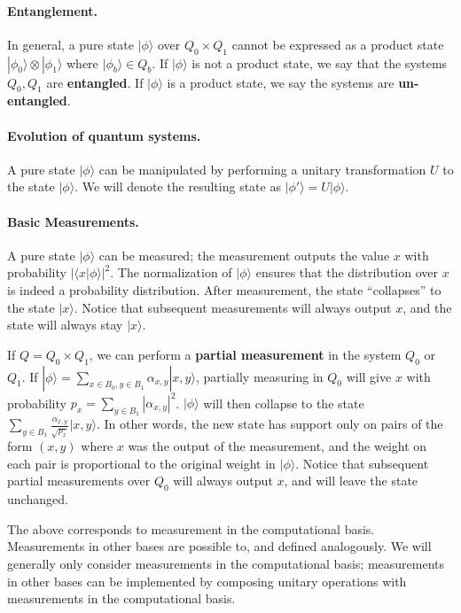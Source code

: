 \paragraph{Entanglement.} In general, a pure state $|\phi\rangle$ over $Q_0\times Q_1$ cannot be expressed as a product state $|\phi_0\rangle\otimes|\phi_1\rangle$ where $|\phi_b\rangle\in Q_b$.  If $|\phi\rangle$ is not a product state, we say that the systems $Q_0,Q_1$ are {\bf entangled}.  If $|\phi\rangle$ is a product state, we say the systems are {\bf un-entangled}.
\paragraph{Evolution of quantum systems.} A pure state $|\phi\rangle$ can be manipulated by performing a unitary transformation $U$ to the state $|\phi\rangle$.  We will denote the resulting state as $|\phi'\rangle=U|\phi\rangle$.
\paragraph{Basic Measurements.} A pure state $|\phi\rangle$ can be measured; the measurement outputs the value $x$ with probability $|\langle x|\phi\rangle|^2$.  The normalization of $|\phi\rangle$ ensures that the distribution over $x$ is indeed a probability distribution.  After measurement, the state ``collapses'' to the state $|x\rangle$.  Notice that subsequent measurements will always output $x$, and the state will always stay $|x\rangle$.

If $Q=Q_0\times Q_1$, we can perform a {\bf partial measurement} in the system $Q_0$ or $Q_1$.  If $|\phi\rangle=\sum_{x\in B_0,y\in B_1}\alpha_{x,y}|x,y\rangle$, partially measuring in $Q_0$ will give $x$ with probability $p_x=\sum_{y\in B_1}|\alpha_{x,y}|^2$.  $|\phi\rangle$ will then collapse to the state $\sum_{y\in B_1}\frac{\alpha_{x,y}}{\sqrt{p_x}}|x,y\rangle$.  In other words, the new state has support only on pairs of the form $(x,y)$ where $x$ was the output of the measurement, and the weight on each pair is proportional to the original weight in $|\phi\rangle$.  Notice that subsequent partial measurements over $Q_0$ will always output $x$, and will leave the state unchanged.

The above corresponds to measurement in the computational basis.  Measurements in other bases are possible to, and defined analogously.  We will generally only consider measurements in the computational basis; measurements in other bases can be implemented by composing unitary operations with measurements in the computational basis.
